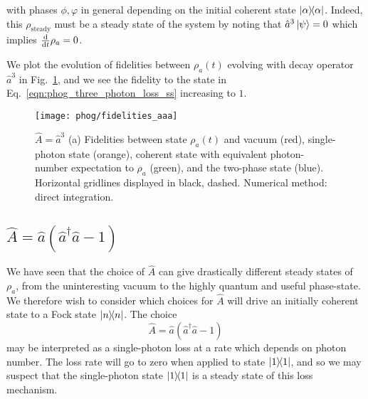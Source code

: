 \noindent with phases $\phi, \varphi$ in general depending on the initial coherent state $\dyad{\alpha}$. %
Indeed, this $\rho_{\text{steady}}$ must be a steady state of the system by noting that $\hat{a}^3 \ket{\psi} = 0$ which implies $\frac{\mathrm{d}}{\mathrm{d}t} \rho_a = 0$.

We plot the evolution of fidelities between $\rho_a\left(t\right)$ evolving with decay operator $\hat{a}^3$ in Fig.~\ref{fig:phog_lindblad_three_photon_loss}, and we see the fidelity to the state in Eq.~\ref{eqn:phog_three_photon_loss_ss} increasing to $1$. 

\begin{figure}[htp]
\centering
\texttt{[image: phog/fidelities\_aaa]}
\caption{\label{fig:phog_lindblad_three_photon_loss}$\hat{A} = \hat{a}^3$ (a) Fidelities between state $\rho_a\left(t\right)$ and vacuum (red), single-photon state (orange), coherent state with equivalent photon-number expectation to $\rho_a$ (green), and the two-phase state (blue).  Horizontal gridlines displayed in black, dashed. Numerical method: direct integration.}
\end{figure}
\fi

\clearpage
\subsection{$\hat{A} = \hat{a}\left(\hat{a}^\dagger \hat{a} - 1\right)$}\label{sec:A_ncl}
We have seen that the choice of $\hat{A}$ can give drastically different steady states of $\rho_a$,  from the uninteresting vacuum to the highly quantum and useful phase-state. We therefore wish to consider which choices for $\hat{A}$ will drive an initially coherent state to a Fock state $\dyad{n}$. The choice 
\begin{equation}\label{eqn:phog_A_ncl}
\hat{A} = \hat{a}\left(\hat{a}^\dagger \hat{a} - 1\right)
\end{equation}
may be interpreted as a single-photon loss at a rate which depends on photon number. The loss rate will go to zero when applied to state $\dyad{1}$, and so we may suspect that the single-photon state $\dyad{1}$ is a steady state of this loss mechanism.

